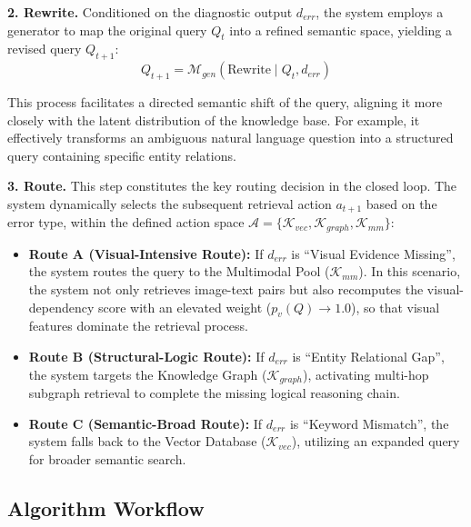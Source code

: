 \documentclass[a4paper, fleqn]{cas-dc}
\begin{document}
\noindent\textbf{2. Rewrite.}
Conditioned on the diagnostic output $d_{err}$, the system employs a generator to map the original query $Q_t$ into a refined semantic space, yielding a revised query $Q_{t+1}$:
\begin{equation}
Q_{t+1} = \mathcal{M}_{gen}(\text{Rewrite} \mid Q_t, d_{err})
\label{eq:query_rewrite}
\end{equation}

This process facilitates a directed semantic shift of the query, aligning it more closely with the latent distribution of the knowledge base.
For example, it effectively transforms an ambiguous natural language question into a structured query containing specific entity relations.

\noindent\textbf{3. Route.}
This step constitutes the key routing decision in the closed loop.
The system dynamically selects the subsequent retrieval action $a_{t+1}$ based on the error type, within the defined action space $\mathcal{A} = \{ \mathcal{K}_{vec}, \mathcal{K}_{graph}, \mathcal{K}_{mm} \}$:
\begin{itemize}
    \item \textbf{Route A (Visual-Intensive Route):} If $d_{err}$ is ``Visual Evidence Missing'', the system routes the query to the Multimodal Pool ($\mathcal{K}_{mm}$). In this scenario, the system not only retrieves image-text pairs but also recomputes the visual-dependency score with an elevated weight ($p_v(Q) \to 1.0$), so that visual features dominate the retrieval process.
    
    \item \textbf{Route B (Structural-Logic Route):} If $d_{err}$ is ``Entity Relational Gap'', the system targets the Knowledge Graph ($\mathcal{K}_{graph}$), activating multi-hop subgraph retrieval to complete the missing logical reasoning chain.

    \item \textbf{Route C (Semantic-Broad Route):} If $d_{err}$ is ``Keyword Mismatch'', the system falls back to the Vector Database ($\mathcal{K}_{vec}$), utilizing an expanded query for broader semantic search.
\end{itemize}
\subsection{Algorithm Workflow}\label{sec:algorithm_workflow}
\end{document}
